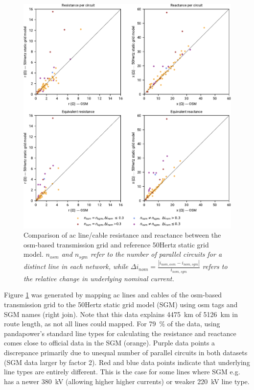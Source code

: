 \documentclass[fleqn,10pt]{wlscirep}
\let\autocite\cite
\providecommand{\DIFaddbegin}{} %
\begin{document}
\newpage
\begin{figure}[!htbp]
    \centering
    \includegraphics{figures/fig_scatter_reactance_resistance.pdf}
    \caption{Comparison of \acrshort{ac} line/cable resistance and reactance between the \acrshort{osm}-based transmission grid and reference 50Hertz static grid model.\autocite{50hertzStaticGridModel2022} \textit{$n_{osm}$ and $n_{sgm}$ refer to the number of parallel circuits for a distinct line in each network, while $\Delta i_{nom} = \frac{|i_{nom, osm} - i_{nom, sgm}|}{i_{nom,sgm}}$ refers to the relative change in underlying nominal current.}}
    \label{fig:scatter_reactance_resistance}
\end{figure}

Figure \ref{fig:scatter_reactance_resistance} was generated by mapping \acrshort{ac} lines and cables of the \acrshort{osm}-based transmission grid to the 50Hertz static grid model (SGM) using \acrshort{osm} tags and SGM names (right join). Note that this data explains \SI{4475}{\kilo\meter} of \SI{5126}{\kilo\meter} in route length, as not all lines could mapped. For \SI{79}{\percent} of the data, using pandapower's standard line types\autocite{thurnerPandapowerOpenSourcePython2018} for calculating the resistance and reactance comes close to official data in the SGM (orange). Purple data points a discrepance primarily due to unequal number of parallel circuits in both datasets (SGM data larger by factor 2). Red and blue data points indicate that underlying line types are entirely different. This is the case for some lines where SGM e.g. has a newer \SI{380}{\kilo\volt} (allowing higher higher currents) or weaker \SI{220}{\kilo\volt} line type.
\DIFaddbegin 
\end{document}
